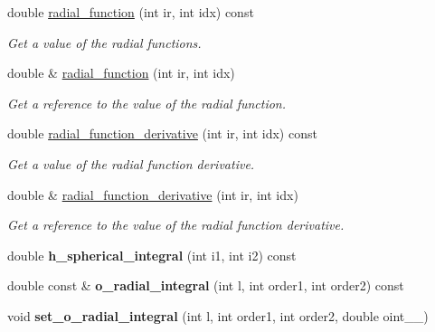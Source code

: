 \begin{DoxyCompactItemize}
\item 
double \hyperlink{classsirius_1_1_atom__symmetry__class_a85b7df31edd8709d31c0ccbafc2a8d43}{radial\+\_\+function} (int ir, int idx) const 
\begin{DoxyCompactList}\small\item\em Get a value of the radial functions. \end{DoxyCompactList}\item 
double \& \hyperlink{classsirius_1_1_atom__symmetry__class_a94987d73d4276d23d10bd7c355d0cb74}{radial\+\_\+function} (int ir, int idx)
\begin{DoxyCompactList}\small\item\em Get a reference to the value of the radial function. \end{DoxyCompactList}\item 
double \hyperlink{classsirius_1_1_atom__symmetry__class_abba151fe781e19fc3c805dd7a11613df}{radial\+\_\+function\+\_\+derivative} (int ir, int idx) const 
\begin{DoxyCompactList}\small\item\em Get a value of the radial function derivative. \end{DoxyCompactList}\item 
double \& \hyperlink{classsirius_1_1_atom__symmetry__class_a6f823482bda27391dd6a5ef53f98be64}{radial\+\_\+function\+\_\+derivative} (int ir, int idx)
\begin{DoxyCompactList}\small\item\em Get a reference to the value of the radial function derivative. \end{DoxyCompactList}\item 
\hypertarget{classsirius_1_1_atom__symmetry__class_a96f5b0e78b5fb44b72486318a75459f0}{}double {\bfseries h\+\_\+spherical\+\_\+integral} (int i1, int i2) const \label{classsirius_1_1_atom__symmetry__class_a96f5b0e78b5fb44b72486318a75459f0}

\item 
\hypertarget{classsirius_1_1_atom__symmetry__class_a16057216e003acdcc23511219b3dcdf8}{}double const \& {\bfseries o\+\_\+radial\+\_\+integral} (int l, int order1, int order2) const \label{classsirius_1_1_atom__symmetry__class_a16057216e003acdcc23511219b3dcdf8}

\item 
\hypertarget{classsirius_1_1_atom__symmetry__class_a461d115d5a23c582fc5964240be7605b}{}void {\bfseries set\+\_\+o\+\_\+radial\+\_\+integral} (int l, int order1, int order2, double oint\+\_\+\+\_\+)\label{classsirius_1_1_atom__symmetry__class_a461d115d5a23c582fc5964240be7605b}


\end{DoxyCompactItemize}
